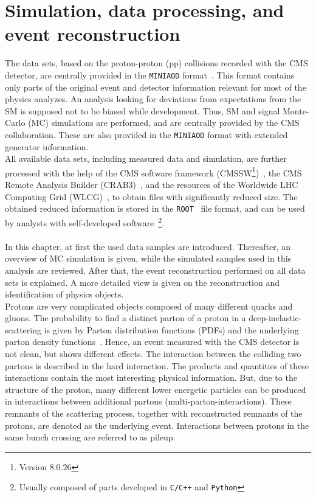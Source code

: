 \chapter{Simulation, data processing, and event reconstruction}\label{chap:reco}
The data sets, based on the proton-proton (pp) collisions recorded with the CMS detector, are centrally provided in the \texttt{MINIAOD} format~\cite{MiniAOD}. This format contains only parts of the original event and detector information relevant for most of the physics analyzes. An analysis looking for deviations from expectations from the SM is supposed not to be biased while development. Thus, SM and signal Monte-Carlo (MC) simulations are performed, and are centrally provided by the CMS collaboration. These are also provided in the \texttt{MINIAOD} format with extended generator information.\\
All available data sets, including measured data and simulation, are further processed with the help of the CMS software framework (CMSSW\footnote{Version 8.0.26})~\cite{CMSSW}, the CMS Remote Analysis Builder (CRAB3)~\cite{CRAB}, and the resources of the Worldwide LHC Computing Grid (WLCG)~\cite{Grid}, to obtain files with significantly reduced size. The obtained reduced information is stored in the \texttt{ROOT}~\cite{ROOT} file format, and can be used by analysts with self-developed software~\footnote{Usually composed of parts developed in \texttt{C/C++} and \texttt{Python}}.\\
\\
In this chapter, at first the used data samples are introduced. Thereafter, an overview of MC simulation is given, while the simulated samples used in this analysis are reviewed. After that, the event reconstruction performed on all data sets is explained. A more detailed view is given on the reconstruction and identification of physics objects.\\

Protons are very complicated objects composed of many different quarks and gluons. The probability to find a distinct parton of a proton in a deep-inelastic-scattering is given by Parton distribution functions (PDFs) and the underlying parton density functions~\cite{PDF}. Hence, an event measured with the CMS detector is not clean, but shows different effects. The interaction between the colliding two partons is described in the hard interaction. The products and quantities of these interactions contain the most interesting physical information. But, due to the structure of the proton, many different lower energetic particles can be produced in interactions between additional partons (multi-parton-interactions). These remnants of the scattering process, together with reconstructed remnants of the protons, are denoted as the underlying event. Interactions between protons in the same bunch crossing are referred to as pileup.

